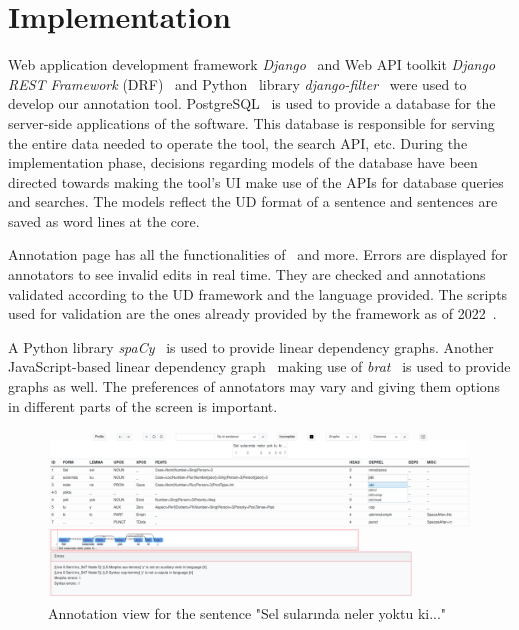 \section{Implementation}
\label{sec:implementation}

Web application development framework \textit{Django}~\cite{django} and Web API toolkit \textit{Django REST Framework} (DRF)~\cite{drf} and Python~\cite{python} library \textit{django-filter}~\cite{django-filter} were used to develop our annotation tool.
PostgreSQL~\cite{psql} is used to provide a database for the server-side applications of the software.
This database is responsible for serving the entire data needed to operate the tool, the search API, etc.
During the implementation phase, decisions regarding models of the database have been directed towards making the tool's UI make use of the APIs for database queries and searches.
The models reflect the UD format of a sentence and sentences are saved as word lines at the core.

Annotation page has all the functionalities of \boatvone\ and more.
Errors are displayed for annotators to see invalid edits in real time.
They are checked and annotations validated according to the UD framework and the language provided.
The scripts used for validation are the ones already provided by the framework as of 2022~\cite{UD-git}.

A Python library \textit{spaCy}~\cite{spacy} is used to provide linear dependency graphs.
Another JavaScript-based linear dependency graph~\cite{spyssalo} making use of \textit{brat}~\cite{brat-vis} is used to provide graphs as well.
The preferences of annotators may vary and giving them options in different parts of the screen is important.

\begin{figure}[tbh]
    \centering
    \includegraphics[width=1\textwidth]{figures/1.png}
    \caption{Annotation view for the sentence "Sel sularında neler yoktu ki..."}
    \label{fig:demo-fig}
\end{figure}

